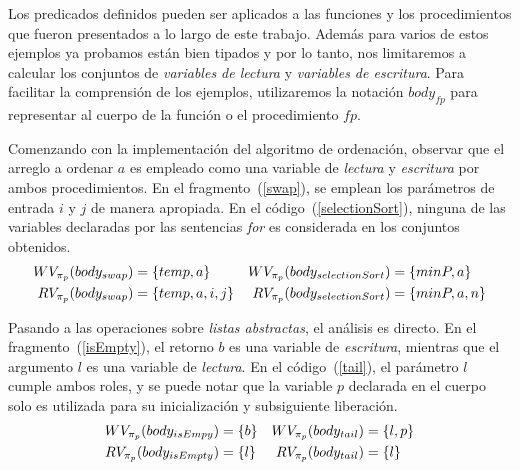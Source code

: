 Los predicados definidos pueden ser aplicados a las funciones y los procedimientos que fueron presentados a lo largo de este trabajo. Además
para varios de estos ejemplos ya probamos están bien tipados y por lo tanto, nos limitaremos a calcular los conjuntos de \textit{variables de lectura} y \textit{variables de escritura}.
Para facilitar la comprensión de los ejemplos, utilizaremos la notación $body_{fp}$ para representar al cuerpo de la función o el procedimiento $fp$.

Comenzando con la implementación del algoritmo de ordenación, observar que el arreglo a ordenar $a$ es empleado como una variable de \textit{lectura} y \textit{escritura} por ambos procedimientos.
En el fragmento~(\ref{swap}), se emplean los parámetros de entrada $i$ y $j$ de manera apropiada.
En el código~(\ref{selectionSort}), ninguna de las variables declaradas por las sentencias \textit{for} es considerada en los conjuntos obtenidos.
\begin{align*}
WV_{\pi_{p}}(body_{swap}) &= \{ temp, a \}
&
WV_{\pi_{p}}(body_{selectionSort}) &= \{ minP, a \}
\\
RV_{\pi_{p}}(body_{swap}) &= \{ temp, a, i, j \}
&
RV_{\pi_{p}}(body_{selectionSort}) &= \{ minP, a, n \}
\end{align*}

Pasando a las operaciones sobre \textit{listas abstractas}, el análisis es directo.
En el fragmento~(\ref{isEmpty}), el retorno $b$ es una variable de \textit{escritura}, mientras que el argumento $l$ es una variable de \textit{lectura}.
En el código~(\ref{tail}), el parámetro $l$ cumple ambos roles, y se puede notar que la variable $p$ declarada en el cuerpo solo es utilizada para su inicialización y subsiguiente liberación.
\begin{align*}
WV_{\pi_{p}}(body_{isEmpy}) &= \{ b \}
&
WV_{\pi_{p}}(body_{tail}) &= \{ l, p \}
\\
RV_{\pi_{p}}(body_{isEmpty}) &= \{ l \}
&
RV_{\pi_{p}}(body_{tail}) &= \{ l \}
\end{align*}



